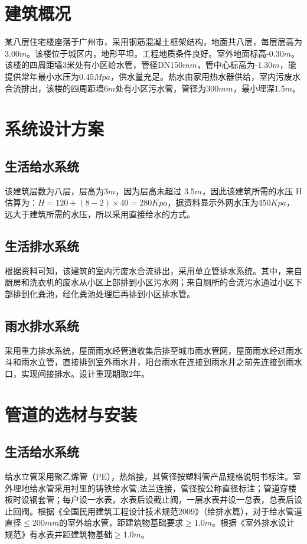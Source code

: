 \documentclass{gdutart}
\begin{document}
  \section{建筑概况}
    某八层住宅楼座落于广州市，采用钢筋混凝土框架结构，地面共八层，每层层高为3.00$m$。该楼位于城区内，地形平坦。工程地质条件良好。室外地面标高-0.30$m$。该楼的四周距墙3米处有小区给水管，管径DN150$mm$，管中心标高为-1.30$m$，能提供常年最小水压为0.45$Mpa$，供水量充足。热水由家用热水器供给，室内污废水合流排出，该楼的四周距墙6$m$处有小区污水管，管径为300$mm$，最小埋深1.5$m$。\clearpage

  \section{系统设计方案}
    \subsection{生活给水系统}
      该建筑层数为八层，层高为3$m$，因为层高未超过 3.5$m$，因此该建筑所需的水压 H 估算为：$H = 120 + (8 - 2) \times 40 = 280 Kpa$，据资料显示外网水压为450$Kpa$，远大于建筑所需的水压，所以采用直接给水的方式。

    \subsection{生活排水系统}
      根据资料可知，该建筑的室内污废水合流排出，采用单立管排水系统。其中，来自厨房和洗衣机的废水从小区上部排到小区污水网；来自厕所的合流污水通过小区下部排到化粪池，经化粪池处理后再排到小区排水管。

    \subsection{雨水排水系统}
      采用重力排水系统，屋面雨水经管道收集后排至城市雨水管网，屋面雨水经过雨水斗和雨水立管，直接排到室外雨水井，阳台雨水在连接到雨水井之前先连接到雨水口，实现间接排水。设计重现期取2年。

  \section{管道的选材与安装}
    \subsection{生活给水系统}
      给水立管采用聚乙烯管（PE），热熔接，其管径按塑料管产品规格说明书标注。室外埋地给水管采用衬里的铸铁给水管,法兰连接，管径按公称直径标注；管道穿楼板时设钢套管；每户设一水表，水表后设截止阀，一层水表井设一总表，总表后设止回阀。根据《全国民用建筑工程设计技术规范2009》（给排水篇），对于给水管道直径$\leq$200$mm$的室外给水管，距建筑物基础要求$\geq$1.0$m$。根据《室外排水设计规范》有水表井距建筑物基础$\geq$1.0$m$。
\end{document}
